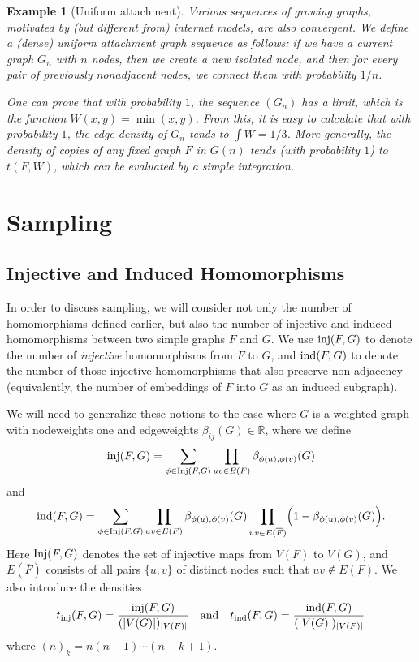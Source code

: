 \documentclass[12pt]{article}
\newtheorem{example}{Example}[section]
\numberwithin{equation}{section}
\def\inj{{\rm inj}}
\def\Inj{{\rm Inj}}
\def\inj{{\rm inj}}
\def\ind{{\rm ind}}
\def\R{{\mathbb R}}
\begin{document}
\begin{example}[Uniform attachment]\label{U-GROW}
Various sequences of growing graphs, motivated by (but different
from) internet models, are also convergent. We define a
{(dense)}
{\it  uniform attachment graph sequence} as follows:
if we have a current graph $G_n$ with $n$
nodes, then we create a new isolated node, and then for every pair of
previously nonadjacent nodes, we connect them with probability $1/n$.

One can prove that with probability $1$, the sequence $(G_n)$ has a
limit, which is the function $W(x,y)=\min(x,y)$. From this, it is
easy to calculate that with probability $1$, the edge density of
$G_n$ tends to $\int W=1/3$. More generally, the density of copies of
any fixed graph $F$ in $G(n)$ tends (with probability $1$) to
$t(F,W)$, which can be evaluated by a simple integration.
\end{example}







\section{Sampling}
\label{sec:sampling}

\subsection{Injective and Induced Homomorphisms}

In order to discuss sampling, we will consider not only the number
of homomorphisms defined earlier, but also the number of injective
and induced homomorphisms between two simple graphs $F$ and $G$. We
use $\inj(F,G)$  to denote the number of {\it injective}
homomorphisms from $F$ to $G$, and  $\ind(F,G)$ to denote the number
of those injective homomorphisms that also preserve non-adjacency
(equivalently, the number of embeddings of $F$ into $G$ as an
induced subgraph).

{We will need to generalize these notions to the case where $G$
is a weighted graph with nodeweights one and edgeweights
$\beta_{ij}(G)\in\R$, where we define
\begin{equation}
\label{inj-def} \inj(F,G)=\sum_{\phi\in\Inj(F,G)} \prod_{uv\in E(F)}
\beta_{\phi(u),\phi(v)}(G)
\end{equation}
and
\begin{equation}
\label{ind-def} \ind(F,G)= \sum_{\phi\in\Inj(F,G)} \prod_{uv\in E(F)}
\beta_{\phi(u),\phi(v)}(G) \prod_{uv\in E(\overline{F})}
\Bigl(1-\beta_{\phi(u),\phi(v)}(G)\Bigr).
\end{equation}
Here $\Inj(F,G)$ denotes the set of injective maps from $V(F)$ to
$V(G)$, and $E(\overline{F})$ consists of all pairs $\{u,v\}$ of
distinct nodes such that $uv\notin E(F)$. We also introduce the
densities
\begin{equation}
t_\inj(F,G)=\frac{\inj(F,G)}{(|V(G)|)_{|V(F)|}}
\quad\text{and}\quad
t_\ind(F,G)=\frac{\ind(F,G)}{(|V(G)|)_{|V(F)|}}
\end{equation}
where $(n)_k=n(n-1)\cdots(n-k+1)$.
}
\end{document}
